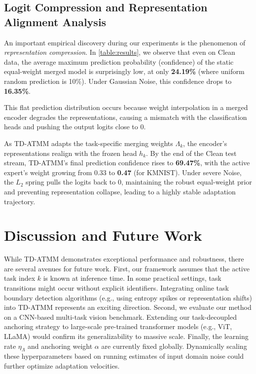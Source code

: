 \documentclass{article}
\theoremstyle{plain}
\theoremstyle{definition}
\theoremstyle{remark}
\begin{document}
\subsection{Logit Compression and Representation Alignment Analysis}
An important empirical discovery during our experiments is the phenomenon of \emph{representation compression}. In \cref{table:results}, we observe that even on Clean data, the average maximum prediction probability (confidence) of the static equal-weight merged model is surprisingly low, at only \textbf{24.19\%} (where uniform random prediction is 10\%). Under Gaussian Noise, this confidence drops to \textbf{16.35\%}. 

This flat prediction distribution occurs because weight interpolation in a merged encoder degrades the representations, causing a mismatch with the classification heads and pushing the output logits close to 0. 

As TD-ATMM adapts the task-specific merging weights $\Lambda_k$, the encoder's representations realign with the frozen head $h_k$. By the end of the Clean test stream, TD-ATMM's final prediction confidence rises to \textbf{69.47\%}, with the active expert's weight growing from 0.33 to \textbf{0.47} (for KMNIST). Under severe Noise, the $L_2$ spring pulls the logits back to 0, maintaining the robust equal-weight prior and preventing representation collapse, leading to a highly stable adaptation trajectory.

\section{Discussion and Future Work}
While TD-ATMM demonstrates exceptional performance and robustness, there are several avenues for future work.
First, our framework assumes that the active task index $k$ is known at inference time. In some practical settings, task transitions might occur without explicit identifiers. Integrating online task boundary detection algorithms (e.g., using entropy spikes or representation shifts) into TD-ATMM represents an exciting direction.
Second, we evaluate our method on a CNN-based multi-task vision benchmark. Extending our task-decoupled anchoring strategy to large-scale pre-trained transformer models (e.g., ViT, LLaMA) would confirm its generalizability to massive scale.
Finally, the learning rate $\eta_{\Lambda}$ and anchoring weight $\alpha$ are currently fixed globally. Dynamically scaling these hyperparameters based on running estimates of input domain noise could further optimize adaptation velocities.
\end{document}
